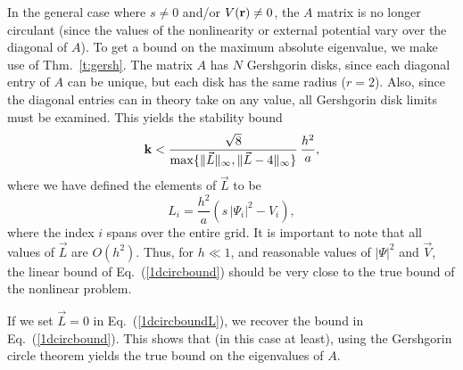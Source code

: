 \documentclass{article}
\begin{document}
In the general case where $s \ne 0$ and/or $V({\bf r}) \ne 0$, the $A$ matrix is no longer circulant (since the values of the nonlinearity or external potential vary over the diagonal of $A$).  To get a bound on the maximum absolute eigenvalue, we make use of Thm.~\ref{t:gersh}.  The matrix $A$ has $N$ Gershgorin disks, since each diagonal entry of $A$ can be unique, but each disk has the same radius ($r=2$).  Also, since the diagonal entries can in theory take on any value, all Gershgorin disk limits must be examined.  This yields the stability bound
\begin{equation}
\label{1dcircboundL}
{\bf k} < \frac{\sqrt{8}}{\max\{\lVert\vec L\rVert_{\infty},\lVert \vec L-4\rVert_{\infty}\}}\,\frac{h^2}{a},
\end{equation}
where we have defined the elements of $\vec L$ to be 
\begin{equation}
\label{Leq}
L_i = \frac{h^2}{a}(s\,|\Psi_i|^2 - V_i),
\end{equation}
where the index $i$ spans over the entire grid.  It is important to note that all values of $\vec L$ are $O(h^2)$.   Thus, for $h\ll 1$, and reasonable values of $|\Psi|^2$ and $\vec V$, the linear bound of Eq.~(\ref{1dcircbound}) should be very close to the true bound of the nonlinear problem.

If we set $\vec L=0$ in Eq.~(\ref{1dcircboundL}), we recover the bound in Eq.~(\ref{1dcircbound}).  This shows that (in this case at least), using the Gershgorin circle theorem yields the true bound on the eigenvalues of $A$.
\end{document}
